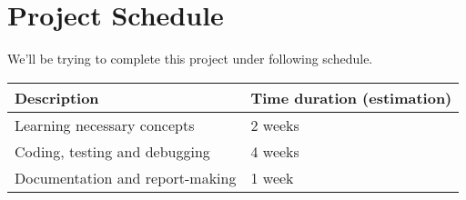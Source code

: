 \section{Project Schedule}

We'll be trying to complete this project under following schedule.

\begin{center}
    \begin{tabular}[H]{l|l}
        \toprule
        {\bf Description} & {\bf Time duration} (estimation)\\
        \hline
        Learning necessary concepts & 2 weeks\\
        Coding, testing and debugging & 4 weeks\\
        Documentation and report-making & 1 week\\
        \bottomrule
    \end{tabular}
\end{center}
